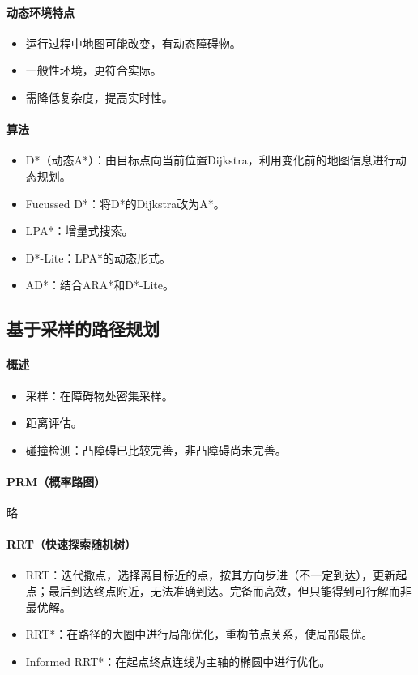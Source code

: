 \documentclass[
12pt, %
a4paper, 
oneside, %
headinclude,footinclude, %
]{scrartcl}
\begin{document}
\paragraph{动态环境特点}
\begin{itemize}
\item 运行过程中地图可能改变，有动态障碍物。
\item 一般性环境，更符合实际。
\item 需降低复杂度，提高实时性。
\end{itemize}
\paragraph{算法}
\begin{itemize}
\item D*（动态A*）：由目标点向当前位置Dijkstra，利用变化前的地图信息进行动态规划。
\item Fucussed D*：将D*的Dijkstra改为A*。
\item LPA*：增量式搜索。
\item D*-Lite：LPA*的动态形式。
\item AD*：结合ARA*和D*-Lite。
\end{itemize}
\subsection[基于采样的路径规划]{基于采样的路径规划}
\paragraph{概述}
\begin{itemize}
\item 采样：在障碍物处密集采样。
\item 距离评估。
\item 碰撞检测：凸障碍已比较完善，非凸障碍尚未完善。
\end{itemize}
\paragraph{PRM（概率路图）}
略
\paragraph{RRT（快速探索随机树）}
\begin{itemize}
\item RRT：迭代撒点，选择离目标近的点，按其方向步进（不一定到达），更新起点；最后到达终点附近，无法准确到达。完备而高效，但只能得到可行解而非最优解。
\item RRT*：在路径的大圈中进行局部优化，重构节点关系，使局部最优。
\item Informed RRT*：在起点终点连线为主轴的椭圆中进行优化。
\end{itemize}
\end{document}
